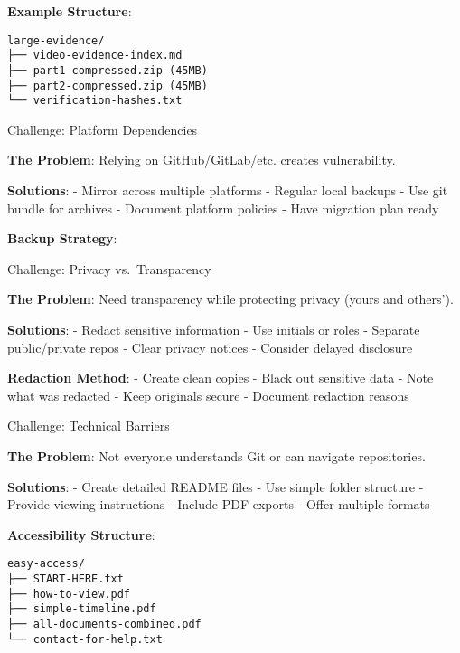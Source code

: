 \textbf{Example Structure}:

\begin{verbatim}
large-evidence/
├── video-evidence-index.md
├── part1-compressed.zip (45MB)
├── part2-compressed.zip (45MB)
└── verification-hashes.txt
\end{verbatim}

Challenge: Platform Dependencies

\textbf{The Problem}: Relying on GitHub/GitLab/etc. creates
vulnerability.

\textbf{Solutions}: - Mirror across multiple platforms - Regular local
backups - Use git bundle for archives - Document platform policies -
Have migration plan ready

\textbf{Backup Strategy}:

\begin{Shaded}
\begin{Highlighting}[]

\end{Highlighting}
\end{Shaded}

Challenge: Privacy vs.~Transparency

\textbf{The Problem}: Need transparency while protecting privacy (yours
and others').

\textbf{Solutions}: - Redact sensitive information - Use initials or
roles - Separate public/private repos - Clear privacy notices - Consider
delayed disclosure

\textbf{Redaction Method}: - Create clean copies - Black out sensitive
data - Note what was redacted - Keep originals secure - Document
redaction reasons

Challenge: Technical Barriers

\textbf{The Problem}: Not everyone understands Git or can navigate
repositories.

\textbf{Solutions}: - Create detailed README files - Use simple folder
structure - Provide viewing instructions - Include PDF exports - Offer
multiple formats

\textbf{Accessibility Structure}:

\begin{verbatim}
easy-access/
├── START-HERE.txt
├── how-to-view.pdf
├── simple-timeline.pdf
├── all-documents-combined.pdf
└── contact-for-help.txt
\end{verbatim}

